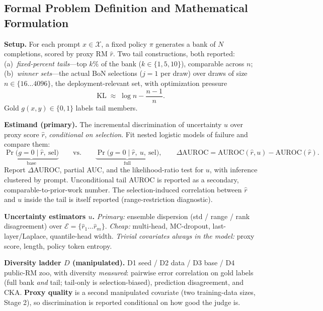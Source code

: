 \documentclass[11pt]{article}
\newcommand{\rhat}{\hat r}
\begin{document}
\subsection{Formal Problem Definition and Mathematical Formulation}
\textbf{Setup.} For each prompt $x \in \mathcal{X}$, a fixed policy $\pi$ generates a
bank of $N$ completions, scored by proxy RM $\rhat$. Two tail constructions, both
reported: (a)~\emph{fixed-percent tails}---top $k\%$ of the bank ($k \in \{1,5,10\}$),
comparable across $n$; (b)~\emph{winner sets}---the actual BoN selections ($j{=}1$ per
draw) over draws of size $n \in \{16 \dots 4096\}$, the deployment-relevant set, with
optimization pressure
\[ \mathrm{KL} \;\approx\; \log n - \frac{n-1}{n}. \]
Gold $g(x,y) \in \{0,1\}$ labels tail members.

\textbf{Estimand (primary).} The incremental discrimination of uncertainty $u$ over
proxy score $\rhat$, \emph{conditional on selection}. Fit nested logistic models of
failure and compare them:
\[
\underbrace{\Pr\!\big(g{=}0 \mid \rhat,\ \mathrm{sel}\big)}_{\text{base}}
\qquad\text{vs.}\qquad
\underbrace{\Pr\!\big(g{=}0 \mid \rhat,\ u,\ \mathrm{sel}\big)}_{\text{full}},
\qquad
\Delta\mathrm{AUROC} = \mathrm{AUROC}(\rhat,u) - \mathrm{AUROC}(\rhat).
\]
Report $\Delta$AUROC, partial AUC, and the likelihood-ratio test for $u$, with
inference clustered by prompt. Unconditional tail AUROC is reported as a secondary,
comparable-to-prior-work number. The selection-induced correlation between $\rhat$
and $u$ inside the tail is itself reported (range-restriction diagnostic).

\textbf{Uncertainty estimators $u$.} \emph{Primary:} ensemble dispersion (std /
range / rank disagreement) over $\mathcal{E}=\{\rhat_1 \dots \rhat_m\}$. \emph{Cheap:}
multi-head, MC-dropout, last-layer/Laplace, quantile-head width. \emph{Trivial
covariates always in the model:} proxy score, length, policy token entropy.

\textbf{Diversity ladder $D$ (manipulated).} D1 seed / D2 data / D3 base /
D4 public-RM zoo, with diversity \emph{measured}: pairwise error correlation on gold
labels (full bank \emph{and} tail; tail-only is selection-biased), prediction
disagreement, and CKA. \textbf{Proxy quality} is a second manipulated covariate
(two training-data sizes, Stage 2), so discrimination is reported conditional on how
good the judge is.
\end{document}
